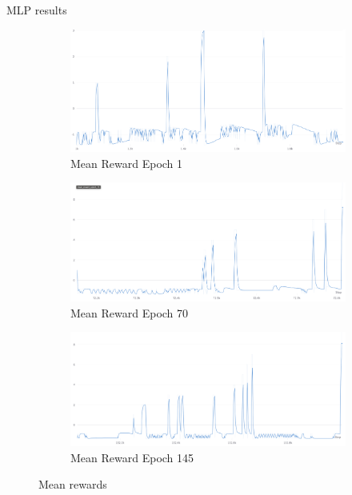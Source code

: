 \documentclass[presentation]{beamer}\mode<presentation>{\usetheme{AMSBolognaFC}}
\begin{document}
\begin{frame}[allowframebreaks]{MLP results}
	\begin{figure}
		\centering
		\begin{subfigure}[b]{0.45\textwidth}
			\centering
			\includegraphics[width=\textwidth]{img/mean_reward_1_epoch.png}
			\caption{Mean Reward Epoch 1}
			\label{fig:d}
		\end{subfigure}
		\hfill
		\begin{subfigure}[b]{0.45\textwidth}
			\centering
			\includegraphics[width=\textwidth]{img/mean_reward_70_epoch.png}
			\caption{Mean Reward Epoch 70}
			\label{fig:e}
		\end{subfigure}
		\hfill
		\begin{subfigure}[b]{0.45\textwidth}
			\centering
			\includegraphics[width=\textwidth]{img/mean_reward_145_epoch.png}
			\caption{Mean Reward Epoch 145} 
			\label{fig:f}
		\end{subfigure}
		\caption{Mean rewards}
	\end{figure}


\end{frame}
\end{document}
